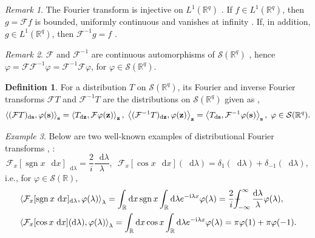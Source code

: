 \documentclass[11pt,A4,twoside]{article}
\numberwithin{equation}{section}
\renewcommand{\vec}{\mathbf}
\newcommand{\intc}{\dashint_{-\infty}^\infty}
\newcommand{\F}{\mathcal{F}}
\newcommand{\Fi}{\mathcal{F}^{-1}}
\renewcommand*\d{\mathop{}\!\mathrm{d}}
\newcommand{\inner}[1]{\left\langle#1 \right\rangle}
\newcommand{\z}{\mathbf{z}}
\newcommand{\R}{\mathbbm{R}}
\renewcommand{\S}{\mathcal{S}}
\DeclareMathOperator*{\sgn}{sgn}
\def\Phint#1{\mathchoice
  {\XXint\displaystyle\textstyle{#1}}%
  {\XXint\textstyle\scriptstyle{#1}}%
  {\XXint\scriptstyle\scriptscriptstyle{#1}}%
  {\XXint\scriptscriptstyle\scriptscriptstyle{#1}}%
  \!\int}
\def\XXint#1#2#3{{\setbox0=\hbox{$#1{#2#3}{\int}$}
    \vcenter{\hbox{$#2#3$}}\kern-.5\wd0}}
\def\dashint{\Phint-}
\theoremstyle{definition}
\newtheorem{definition}{Definition}[section]
\theoremstyle{remark}
\newtheorem{remark}{Remark}[section]
\newtheorem{example}[remark]{Example}
\def\sp{,\;}
\def\z{\vec z}
\def\R{\mathbb{R}}
\def\thermi{{\rm i}}%
\begin{document}
\begin{remark}\label{rem:fourl1}
   The Fourier transform is injective on $L^1(\R^q)$ \cite[Corollary 8.5]{knapp2007basic}.
   If $f \in L^1(\R^q)$, then $g=\F f $ is bounded, uniformly continuous and vanishes at infinity \cite[Proposition 8.1 and Theorem 8.3]{knapp2007basic}. 
If, in addition, $g\in L^1 (\R^q)$, then  
$\F^{-1} g 
     = f 
$
\citep*[Theorem 8.4]{knapp2007basic}.
\end{remark}
 
\begin{remark}\label{rem:fourcont}
    $\F $ and $\Fi$ are continuous automorphisms of $\S(\R^q)$ \cite[Theorem 2 page 143]{kanwal}, hence~$ \varphi= \F \Fi \varphi = \Fi \F \varphi$, for $\varphi \in \S(\R^q)$.
\end{remark}



\begin{definition} For a distribution $T$ on $\S(\R^q)$, its Fourier and inverse Fourier transforms $\F T$ and $\Fi T$ are the distributions on $ \S (\R^q) $ given as
\citep[Theorem 3 page 147]{kanwal}, \cite[Section 10.4 and 10.10]{king_2009}
\begin{align}\label{eq:def_F_dist} \inner{(\F T)_{\d\s}, \varphi(\s)}_\s = \inner{T_{\d\z},\F \varphi(\z)}_{\z}\sp 
        \inner{(\Fi T)_{\d\z}, \varphi(\z)}_{\z} = \inner{T_{\d\s},\Fi \varphi(\s)}_\s
        \sp \varphi \in\S(\R^q).
\end{align} 
\end{definition}

\begin{example} \label{ex:fourier_dist}
Below are two well-known examples of distributional Fourier transforms \citep[page 489]{king_2009}, \citep[page 415]{kammler2008}: $$ \F_x [\sgn x\, \d x]_{\d\lambda} = \frac2i \frac{\d\lambda}{\lambda} \sp\   \F_x [\cos x\, \d x](\d\lambda) = \delta_1(\d\lambda) +  \delta_{-1}(\d\lambda),$$ i.e., for $\varphi\in\S(\R),$ 
\begin{align}
    & %
 \inner{\F_x [\sgn x\, \d x]_{\d\lambda},\varphi(\lambda)}_{\lambda} 
     = \int_\R \d x \sgn x \int_\R\d \lambda e^{-\thermi  \lambda x} \varphi(\lambda)
    =  \frac2i\intc\frac{\d\lambda}{\lambda}  \varphi(\lambda) ,
    \label{e:sgn}\\
    & %
    \inner{\F_x[{\cos x\,\d x}](\d \lambda) ,\varphi(\lambda)}_{\lambda}
     = \int_{\R} \d x\cos x \int_\R\d \lambda e^{-\thermi  \lambda x} \varphi(\lambda) 
    = \pi\varphi(1)+ \pi\varphi(-1).\label{e:sincos}  %
\end{align}
\end{example}
\end{document}
